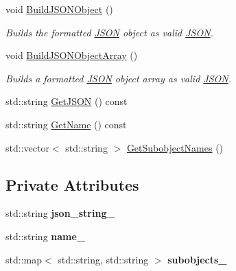 \begin{DoxyCompactItemize}
\item 
\mbox{\label{class_j_s_o_n_a787853af8411929c171e4584166d5b9f}} 
void \mbox{\hyperlink{class_j_s_o_n_a787853af8411929c171e4584166d5b9f}{Build\+J\+S\+O\+N\+Object}} ()
\begin{DoxyCompactList}\small\item\em Builds the formatted \mbox{\hyperlink{class_j_s_o_n}{J\+S\+ON}} object as valid \mbox{\hyperlink{class_j_s_o_n}{J\+S\+ON}}. \end{DoxyCompactList}\item 
\mbox{\label{class_j_s_o_n_a5bb97e38af86ef0b9fc9ea96ef7d5b32}} 
void \mbox{\hyperlink{class_j_s_o_n_a5bb97e38af86ef0b9fc9ea96ef7d5b32}{Build\+J\+S\+O\+N\+Object\+Array}} ()
\begin{DoxyCompactList}\small\item\em Builds a formatted \mbox{\hyperlink{class_j_s_o_n}{J\+S\+ON}} object array as valid \mbox{\hyperlink{class_j_s_o_n}{J\+S\+ON}}. \end{DoxyCompactList}\item 
std\+::string \mbox{\hyperlink{class_j_s_o_n_a879475ff669a2f155f3528fc9396ad40}{Get\+J\+S\+ON}} () const
\item 
std\+::string \mbox{\hyperlink{class_j_s_o_n_ad9a0666a627ced324d1676188362f8b6}{Get\+Name}} () const
\item 
std\+::vector$<$ std\+::string $>$ \mbox{\hyperlink{class_j_s_o_n_ac16428c04937871635332ed5352aa773}{Get\+Subobject\+Names}} ()
\end{DoxyCompactItemize}
\subsection*{Private Attributes}
\begin{DoxyCompactItemize}
\item 
\mbox{\label{class_j_s_o_n_aa7422045fae66848960db7804e4dcb40}} 
std\+::string {\bfseries json\+\_\+string\+\_\+}
\item 
\mbox{\label{class_j_s_o_n_a06454f3b9da1372d9e7b2f7f6a5e3722}} 
std\+::string {\bfseries name\+\_\+}
\item 
\mbox{\label{class_j_s_o_n_a28155af3805f583ff4ef5ffcb59ba1b2}} 
std\+::map$<$ std\+::string, std\+::string $>$ {\bfseries subobjects\+\_\+}
\end{DoxyCompactItemize}


